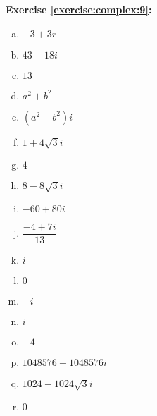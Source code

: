 \noindent\textbf{Exercise \ref{exercise:complex:9}:}
\begin{multicols}{2}
\begin{enumerate}[(a)]
\item
$-3 + 3r$

\item
$43 - 18i$

\item
$13$

\item
$a^2 + b^2$

\item
$(a^2 + b^2)i$

\item
$1 + 4\sqrt{3}i$

\item
$4$

\item
$8 - 8\sqrt{3}i$

\item 
$-60 + 80i$

\item
$\dfrac{-4 + 7i}{13}$

\item
$i$

\item
$0$

\item
$-i$

\item
$i$

\item
$-4$

\item
$1048576 + 1048576i$

\item
$1024 - 1024\sqrt{3}i$

\item
0
\end{enumerate}
\end{multicols}

